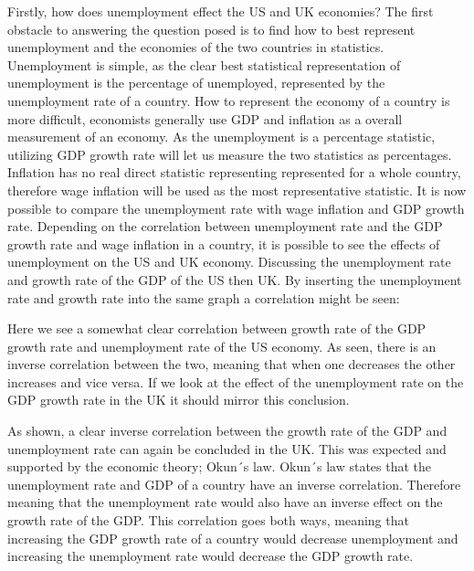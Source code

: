 Firstly, how does unemployment effect the US and UK economies?
The first obstacle to answering the question posed is to find how to best represent unemployment and the economies of the two countries in statistics.
Unemployment is simple, as the clear best statistical representation of unemployment is the percentage of unemployed, represented by the unemployment rate of a country.
How to represent the economy of a country is more difficult, economists generally use GDP and inflation as a overall measurement of an economy.
As the unemployment is a percentage statistic, utilizing GDP growth rate will let us measure the two statistics as percentages.
Inflation has no real direct statistic representing represented for a whole country, therefore wage inflation will be used as the most representative statistic.
It is now possible to compare the unemployment rate with wage inflation and GDP growth rate.
Depending on the correlation between unemployment rate and the GDP growth rate and wage inflation in a country, it is possible to see the effects of unemployment on the US and UK economy.
Discussing the unemployment rate and growth rate of the GDP of the US then UK.
By inserting the unemployment rate and growth rate into the same graph a correlation might be seen: \\


Here we see a somewhat clear correlation between growth rate of the GDP growth rate and unemployment rate of the US economy.
As seen, there is an inverse correlation between the two, meaning that when one decreases the other increases and vice versa.
If we look at the effect of the unemployment rate on the GDP growth rate in the UK it should mirror this conclusion. \\


As shown, a clear inverse correlation between the growth rate of the GDP and unemployment rate can again be concluded in the UK.
This was expected and supported by the economic theory; Okun´s law.
Okun´s law states that the unemployment rate and GDP of a country have an inverse correlation.
Therefore meaning that the unemployment rate would also have an inverse effect on the growth rate of the GDP. \cite{Economics_Okuns_Law}
This correlation goes both ways, meaning that increasing the GDP growth rate of a country would decrease unemployment and increasing the unemployment rate would decrease the GDP growth rate. \\

